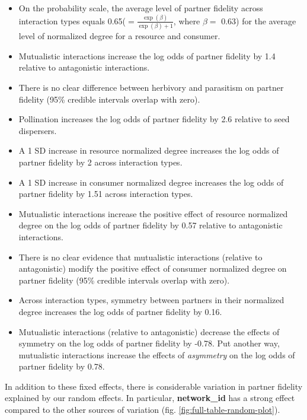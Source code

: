 \documentclass[11pt,]{article}
\begin{document}
\begin{itemize}
\item
  On the probability scale, the average level of partner fidelity across
  interaction types equals 0.65(\(=\frac{\exp(\beta)}{\exp(\beta)+1}\),
  where \(\beta=\) 0.63) for the average level of normalized degree for
  a resource and consumer.
\item
  Mutualistic interactions increase the log odds of partner fidelity by
  1.4 relative to antagonistic interactions.
\item
  There is no clear difference between herbivory and parasitism on
  partner fidelity (95\% credible intervals overlap with zero).
\item
  Pollination increases the log odds of partner fidelity by 2.6 relative
  to seed dispersers.
\item
  A 1 SD increase in resource normalized degree increases the log odds
  of partner fidelity by 2 across interaction types.
\item
  A 1 SD increase in consumer normalized degree increases the log odds
  of partner fidelity by 1.51 across interaction types.
\item
  Mutualistic interactions increase the positive effect of resource
  normalized degree on the log odds of partner fidelity by 0.57 relative
  to antagonistic interactions.
\item
  There is no clear evidence that mutualistic interactions (relative to
  antagonistic) modify the positive effect of consumer normalized degree
  on partner fidelity (95\% credible intervals overlap with zero).
\item
  Across interaction types, symmetry between partners in their
  normalized degree increases the log odds of partner fidelity by 0.16.
\item
  Mutualistic interactions (relative to antagonistic) decrease the
  effects of symmetry on the log odds of partner fidelity by -0.78. Put
  another way, mutualistic interactions increase the effects of
  \emph{asymmetry} on the log odds of partner fidelity by 0.78.
\end{itemize}

In addition to these fixed effects, there is considerable variation in
partner fidelity explained by our random effects. In particular,
\textbf{network\_id} has a strong effect compared to the other sources
of variation (fig. \ref{fig:full-table-random-plot}).
\end{document}
